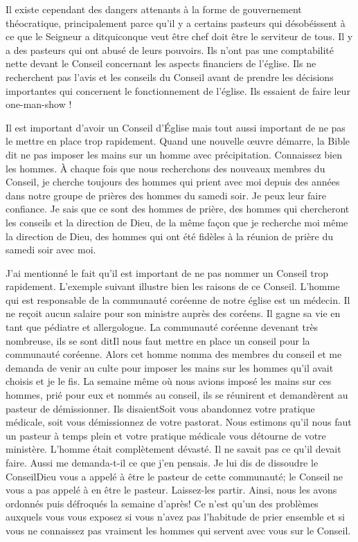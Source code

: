 Il existe cependant des dangers attenants à la forme de gouvernement théocratique, principalement parce qu’il y a
certains pasteurs qui désobéissent à ce que le Seigneur a dit\frcolon\og quiconque veut être chef doit être le serviteur de
tous.\fg{} Il y a des pasteurs qui ont abusé de leurs pouvoirs. Ils n’ont pas une comptabilité nette devant le Conseil
concernant les aspects financiers de l’église. Ils ne recherchent pas l’avis et les conseils du Conseil avant de prendre
les décisions importantes qui concernent le fonctionnement de l’église. Ils essaient de faire leur \og one-man-show \fg{}!

Il est important d’avoir un Conseil d’Église mais tout aussi important de ne pas le mettre en place trop rapidement.
Quand une nouvelle œuvre démarre, la Bible dit ne pas imposer les mains sur un homme avec précipitation.
Connaissez bien les hommes. À chaque fois que nous recherchons des nouveaux membres du Conseil, je cherche
toujours des hommes qui prient avec moi depuis des années dans notre groupe de prières des hommes du samedi
soir. Je peux leur faire confiance. Je sais que ce sont des hommes de prière, des hommes qui chercheront les conseils
et la direction de Dieu, de la même façon que je recherche moi même la direction de Dieu, des hommes qui ont été
fidèles à la réunion de prière du samedi soir avec moi.

J’ai mentionné le fait qu’il est important de ne pas nommer un Conseil trop rapidement. L’exemple suivant illustre bien
les raisons de ce Conseil. L’homme qui est responsable de la communauté coréenne de notre église est un médecin. Il
ne reçoit aucun salaire pour son ministre auprès des coréens. Il gagne sa vie en tant que pédiatre et allergologue. La
communauté coréenne devenant très nombreuse, ils se sont dit\frcolon\og Il nous faut mettre en place un conseil pour la
communauté coréenne. \fg{} Alors cet homme nomma des membres du conseil et me demanda de venir au culte pour
imposer les mains sur les hommes qu’il avait choisis et je le fis. La semaine même où nous avions imposé les mains
sur ces hommes, prié pour eux et nommés au conseil, ils se réunirent et demandèrent au pasteur de démissionner. Ils
disaient\frcolon\og Soit vous abandonnez votre pratique médicale, soit vous démissionnez de votre pastorat. Nous estimons
qu’il nous faut un pasteur à temps plein et votre pratique médicale vous détourne de votre ministère.\fg{} L’homme était
complètement dévasté. Il ne savait pas ce qu’il devait faire. Aussi me demanda-t-il ce que j’en pensais. Je lui dis de
dissoudre le Conseil\frcolon\og Dieu vous a appelé à être le pasteur de cette communauté; le Conseil ne vous a pas appelé à
en être le pasteur. Laissez-les partir.\fg{} Ainsi, nous les avons ordonnés puis défroqués la semaine d'après! Ce n’est
qu’un des problèmes auxquels vous vous exposez si vous n’avez pas l’habitude de prier ensemble et si vous ne
connaissez pas vraiment les hommes qui servent avec vous sur le Conseil.

